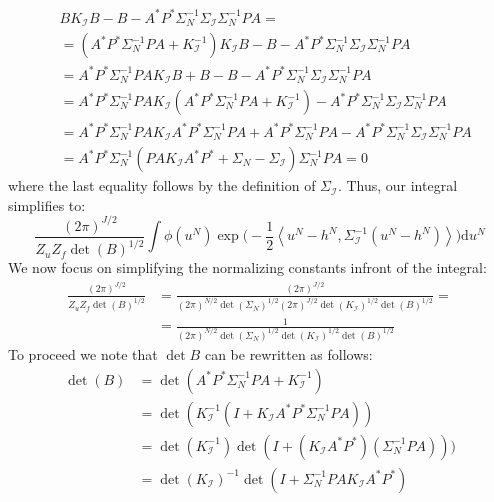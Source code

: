 \documentclass{article}
\theoremstyle{definition}
\theoremstyle{remark}
\begin{document}
\begin{align*}
    &BK_{\mathcal{I}}B-B-A^{*}P^{*}\Sigma_{N}^{-1}\Sigma_{\mathcal{I}}\Sigma_{N}^{-1}PA = \\
    &=(A^{*}P^{*}\Sigma_{N}^{-1}PA+K_{\mathcal{I}}^{-1})K_{\mathcal{I}}B-B-A^{*}P^{*}\Sigma_{N}^{-1}\Sigma_{\mathcal{I}}\Sigma_{N}^{-1}PA \\
    &=A^{*}P^{*}\Sigma_{N}^{-1}PAK_{\mathcal{I}}B+B-B-A^{*}P^{*}\Sigma_{N}^{-1}\Sigma_{\mathcal{I}}\Sigma_{N}^{-1}PA \\
    &=A^{*}P^{*}\Sigma_{N}^{-1}PAK_{\mathcal{I}}(A^{*}P^{*}\Sigma_{N}^{-1}PA+K_{\mathcal{I}}^{-1})-A^{*}P^{*}\Sigma_{N}^{-1}\Sigma_{\mathcal{I}}\Sigma_{N}^{-1}PA \\
    &=A^{*}P^{*}\Sigma_{N}^{-1}PAK_{\mathcal{I}}A^{*}P^{*}\Sigma_{N}^{-1}PA + A^{*}P^{*}\Sigma_{N}^{-1}PA - A^{*}P^{*}\Sigma_{N}^{-1}\Sigma_{\mathcal{I}}\Sigma_{N}^{-1}PA \\
    &= A^{*}P^{*}\Sigma_{N}^{-1}(PAK_{\mathcal{I}}A^{*}P^{*}+\Sigma_{N}-\Sigma_{\mathcal{I}})\Sigma_{N}^{-1}PA = 0
\end{align*}
where the last equality follows by the definition of $\Sigma_{\mathcal{I}}$. Thus, our integral simplifies to:
\begin{equation}
    \frac{(2\pi)^{J/2}}{Z_{u}Z_{f}\det(B)^{1/2}}\int\phi(u^{N})\exp\Big(-\frac{1}{2}\left\langle u^{N}-h^{N},\Sigma_{\mathcal{I}}^{-1}(u^{N}-h^{N}) \right\rangle\Big)\mathrm{d}u^{N}
\end{equation}
We now focus on simplifying the normalizing constants infront of the integral:
\begin{align*}
    \frac{(2\pi)^{J/2}}{Z_{u}Z_{f}\det(B)^{1/2}}&=\frac{(2\pi)^{J/2}}{(2\pi)^{N/2}\det(\Sigma_N)^{1/2}(2\pi)^{J/2}\det(K_\mathcal{I})^{1/2}\det(B)^{1/2}}= \\
    &=\frac{1}{(2\pi)^{N/2}\det(\Sigma_N)^{1/2}\det(K_\mathcal{I})^{1/2}\det(B)^{1/2}}
\end{align*}
To proceed we note that $\det{B}$ can be rewritten as follows:
\begin{align*}
    \det(B)&=\det(A^{*}P^{*}\Sigma_{N}^{-1}PA + K_{\mathcal{I}}^{-1}) \\
    &=\det(K_{\mathcal{I}}^{-1}(I+K_{\mathcal{I}}A^{*}P^{*}\Sigma_{N}^{-1}PA)) \\
    &=\det(K_{\mathcal{I}}^{-1})\det(I+(K_{\mathcal{I}}A^{*}P^{*})(\Sigma_{N}^{-1}PA))) \\
    &=\det(K_{\mathcal{I}})^{-1}\det(I+\Sigma_{N}^{-1}PAK_{\mathcal{I}}A^{*}P^{*})
\end{align*}
\end{document}
